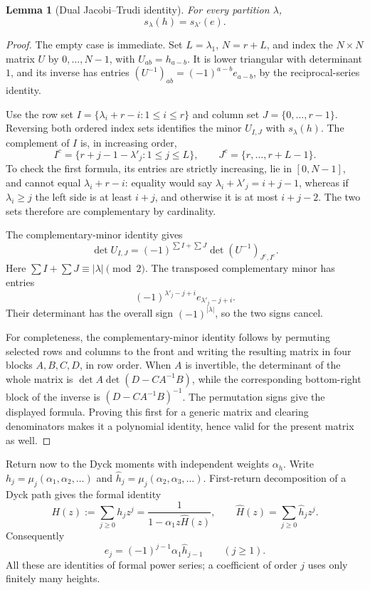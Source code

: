 \documentclass[11pt]{article}
\newtheorem{lemma}[theorem]{Lemma}
\theoremstyle{definition}
\theoremstyle{remark}
\begin{document}
\begin{lemma}[Dual Jacobi--Trudi identity]\label{lem:dual}
For every partition $\lambda$,
\[
 s_\lambda(h)=s_{\lambda'}(e).
\]
\end{lemma}
\begin{proof}
The empty case is immediate. Set $L=\lambda_1$, $N=r+L$, and index the
$N\times N$ matrix $U$ by $0,\ldots,N-1$, with $U_{ab}=h_{a-b}$.
It is lower triangular with determinant $1$, and its inverse has entries
$(U^{-1})_{ab}=(-1)^{a-b}e_{a-b}$, by the reciprocal-series identity.

Use the row set $I=\{\lambda_i+r-i:1\le i\le r\}$ and column set
$J=\{0,\ldots,r-1\}$. Reversing both ordered index sets identifies the
minor $U_{I,J}$ with $s_\lambda(h)$. The complement of $I$ is, in increasing
order,
\[
 I^c=\{r+j-1-\lambda'_j:1\le j\le L\},\qquad
 J^c=\{r,\ldots,r+L-1\}.
\]
To check the first formula, its entries are strictly increasing, lie in
$[0,N-1]$, and cannot equal $\lambda_i+r-i$: equality would say
$\lambda_i+\lambda'_j=i+j-1$, whereas if $\lambda_i\ge j$ the left side
is at least $i+j$, and otherwise it is at most $i+j-2$.
The two sets therefore are complementary by cardinality.

The complementary-minor identity gives
\[
 \det U_{I,J}=(-1)^{\sum I+\sum J}\det(U^{-1})_{J^c,I^c}.
\]
Here $\sum I+\sum J\equiv |\lambda|\pmod2$.
The transposed complementary minor has entries
\[
 (-1)^{\lambda'_j-j+i}e_{\lambda'_j-j+i}.
\]
Their determinant has the overall sign $(-1)^{|\lambda|}$, so the two
signs cancel.

For completeness, the complementary-minor identity follows by permuting
selected rows and columns to the front and writing the resulting matrix
in four blocks $A,B,C,D$, in row order.
When $A$ is invertible, the determinant of the whole matrix is
$\det A\det(D-CA^{-1}B)$, while the corresponding bottom-right block of
the inverse is $(D-CA^{-1}B)^{-1}$. The permutation signs give the displayed
formula. Proving this first for a generic matrix and clearing denominators
makes it a polynomial identity, hence valid for the present matrix as well.
\end{proof}

Return now to the Dyck moments with independent weights $\alpha_h$.
Write $h_j=\mu_j(\alpha_1,\alpha_2,\ldots)$ and
$\widehat h_j=\mu_j(\alpha_2,\alpha_3,\ldots)$.
First-return decomposition of a Dyck path gives the formal identity
\begin{equation}\label{eq:reciprocal}
 H(z):=\sum_{j\ge0}h_jz^j
 =\frac{1}{1-\alpha_1z\widehat H(z)},\qquad
 \widehat H(z)=\sum_{j\ge0}\widehat h_jz^j.
\end{equation}
Consequently
\begin{equation}\label{eq:e}
 e_j=(-1)^{j-1}\alpha_1\widehat h_{j-1}\qquad(j\ge1).
\end{equation}
All these are identities of formal power series; a coefficient of order
$j$ uses only finitely many heights.
\end{document}
